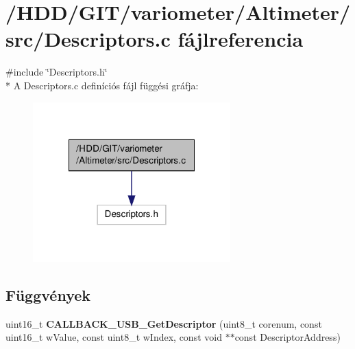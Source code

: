 \section{/\-H\-D\-D/\-G\-I\-T/variometer/\-Altimeter/src/\-Descriptors.c fájlreferencia}
\label{_descriptors_8c}
{\ttfamily \#include \char`\"{}Descriptors.\-h\char`\"{}}\\*
A Descriptors.\-c definíciós fájl függési gráfja\-:
\nopagebreak
\begin{figure}[H]
\begin{center}
\leavevmode
\includegraphics[width=216pt]{_descriptors_8c__incl}
\end{center}
\end{figure}
\subsection*{Függvények}
\begin{DoxyCompactItemize}
\item 
uint16\-\_\-t {\bf C\-A\-L\-L\-B\-A\-C\-K\-\_\-\-U\-S\-B\-\_\-\-Get\-Descriptor} (uint8\-\_\-t corenum, const uint16\-\_\-t w\-Value, const uint8\-\_\-t w\-Index, const void $\ast$$\ast$const Descriptor\-Address)
\end{DoxyCompactItemize}
